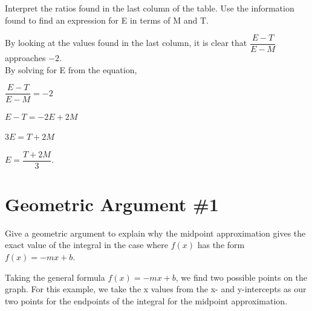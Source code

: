 \documentclass[letterpaper,12pt]{article}
\theoremstyle{definition}
\begin{document}
\begin{large}

 Interpret the ratios found in the last column of the table. Use the information found to find an expression for E in terms of M and T.

\end{large}

\vspace{1cm}

By looking at the values found in the last column, it is clear that $\dfrac{E-T}{E-M}$ approaches $-2$.\\
By solving for E from the equation,

\vspace{0.7cm}
\centerline{$\dfrac{E-T}{E-M}=-2$}
\vspace{0.7cm}
\centerline{$E-T=-2E+2M$}
\vspace{0.7cm}
\centerline{$3E=T+2M$}
\vspace{0.7cm}
\centerline{$E=\dfrac{T+2M}{3}$.}

\pagebreak

\section{Geometric Argument \#1}

\begin{large}

 Give a geometric argument to explain why the midpoint approximation gives the exact value of the integral in the case where $f(x)$ has the form $f(x)=-mx+b$.

\end{large}

\vspace{1cm}

Taking the general formula $f(x)=-mx+b$, we find two possible points on the graph. For this example, we take the x values from the x- and y-intercepts as our two points for the endpoints of the integral for the midpoint approximation.

\vspace{1cm}

\centering
\end{document}
